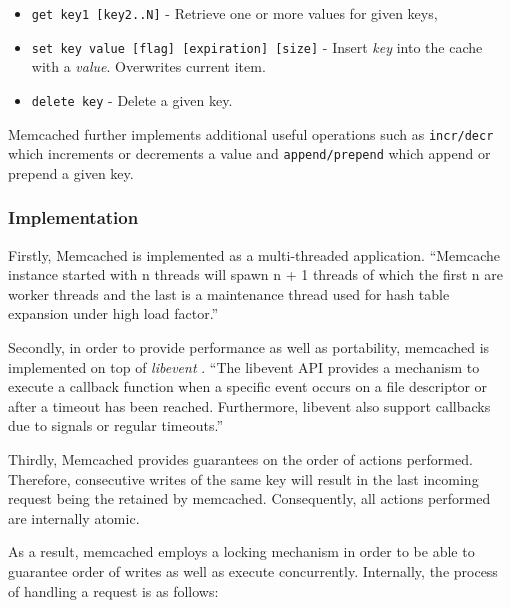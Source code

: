\begin{itemize}
    \item \texttt{get key1 [key2..N]} - Retrieve one or more values for given keys,
    \item \texttt{set key value [flag] [expiration] [size]} - Insert \textit{key} into the cache with a \textit{value}. Overwrites current item.
    \item \texttt{delete key} - Delete a given key.
\end{itemize}

Memcached further implements additional useful operations such as \texttt{incr/decr} which increments or decrements a value and \texttt{append/prepend} which append or prepend a given key.

\subsubsection{Implementation}
Firstly, Memcached is implemented as a multi-threaded application. ``Memcache instance started with n threads will spawn n + 1 threads of which the first n are worker threads and the last
is a maintenance thread used for hash table expansion under high load factor.'' \cite{solarflarememcached}

Secondly, in order to provide performance as well as  portability, memcached is implemented on top of \textit{libevent} \cite{libevent}. ``The libevent API provides a mechanism to execute a callback function when a specific event occurs on a file descriptor or after a timeout has been reached. Furthermore, libevent also support callbacks due to signals or regular timeouts.'' \cite{libevent}

Thirdly, Memcached provides guarantees on the order of actions performed. Therefore, consecutive writes of the same key will result in the last incoming request being the retained by memcached. Consequently, all actions performed are internally atomic.

As a result, memcached employs a locking mechanism in order to be able to guarantee order of writes as well as execute concurrently. Internally, the process of handling a request is as follows:

